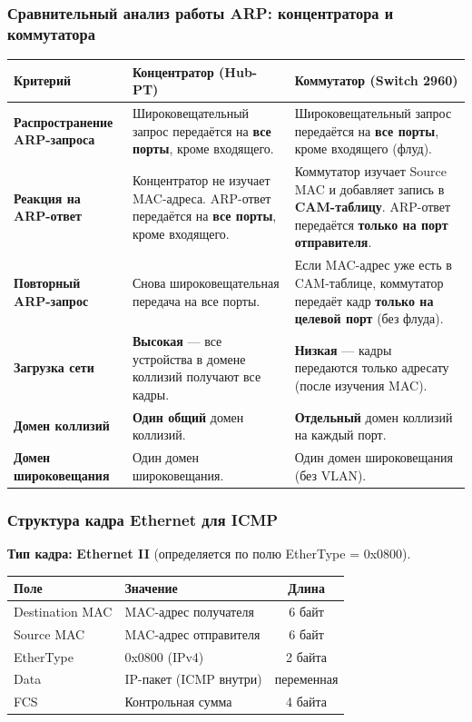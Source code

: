 \begin{enumerate}
\subsubsection*{Сравнительный анализ работы ARP: концентратора и коммутатора}
\begin{center}
\begin{tabular}{|p{4cm}|p{5cm}|p{5cm}|}
\hline
\textbf{Критерий} & \textbf{Концентратор (Hub-PT)} & \textbf{Коммутатор (Switch 2960)} \\
\hline
\textbf{Распространение ARP-запроса} & Широковещательный запрос передаётся на \textbf{все порты}, кроме входящего. & Широковещательный запрос передаётся на \textbf{все порты}, кроме входящего (флуд). \\
\hline
\textbf{Реакция на ARP-ответ} & Концентратор не изучает MAC-адреса. ARP-ответ передаётся на \textbf{все порты}, кроме входящего. & Коммутатор изучает Source MAC и добавляет запись в \textbf{CAM-таблицу}. ARP-ответ передаётся \textbf{только на порт отправителя}. \\
\hline
\textbf{Повторный ARP-запрос} & Снова широковещательная передача на все порты. & Если MAC-адрес уже есть в CAM-таблице, коммутатор передаёт кадр \textbf{только на целевой порт} (без флуда). \\
\hline
\textbf{Загрузка сети} & \textbf{Высокая} — все устройства в домене коллизий получают все кадры. & \textbf{Низкая} — кадры передаются только адресату (после изучения MAC). \\
\hline
\textbf{Домен коллизий} & \textbf{Один общий} домен коллизий. & \textbf{Отдельный} домен коллизий на каждый порт. \\
\hline
\textbf{Домен широковещания} & Один домен широковещания. & Один домен широковещания (без VLAN). \\
\hline
\end{tabular}
\end{center}

\subsubsection*{Структура кадра Ethernet для ICMP}
\textbf{Тип кадра:} \textbf{Ethernet II} (определяется по полю EtherType = 0x0800).

\begin{center}
\begin{tabular}{|l|l|c|}
\hline
\textbf{Поле} & \textbf{Значение} & \textbf{Длина} \\
\hline
Destination MAC & MAC-адрес получателя & 6 байт \\
Source MAC & MAC-адрес отправителя & 6 байт \\
EtherType & 0x0800 (IPv4) & 2 байта \\
Data & IP-пакет (ICMP внутри) & переменная \\
FCS & Контрольная сумма & 4 байта \\
\hline
\end{tabular}
\end{center}


\end{enumerate}

